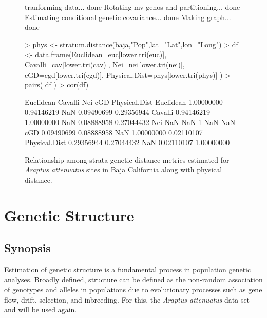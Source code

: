 \documentclass[letterpaper,twoside,openany]{book}
\begin{document}
\begin{figure}[bth]
	\centering
\begin{Schunk}
\begin{Soutput}
tranforming data... done
Rotating mv genos and partitioning...  done
Estimating conditional genetic covariance... done
Making graph... done
\end{Soutput}
\begin{Sinput}
> phys <- stratum.distance(baja,"Pop",lat="Lat",lon="Long")
> df <- data.frame(Euclidean=euc[lower.tri(euc)], Cavalli=cav[lower.tri(cav)], Nei=nei[lower.tri(nei)], cGD=cgd[lower.tri(cgd)], Physical.Dist=phys[lower.tri(phys)] )
> pairs( df )
> cor(df)
\end{Sinput}
\begin{Soutput}
               Euclidean    Cavalli Nei        cGD Physical.Dist
Euclidean     1.00000000 0.94146219 NaN 0.09490699    0.29356944
Cavalli       0.94146219 1.00000000 NaN 0.08888958    0.27044432
Nei                  NaN        NaN   1        NaN           NaN
cGD           0.09490699 0.08888958 NaN 1.00000000    0.02110107
Physical.Dist 0.29356944 0.27044432 NaN 0.02110107    1.00000000
\end{Soutput}
\end{Schunk}
	\caption{Relationship among strata genetic distance metrics estimated for \emph{Araptus attenuatus} sites in Baja California along with physical distance.}
	\label{fig:sonora_strata_dist}
\end{figure}


\chapter{Genetic Structure}


\section{Synopsis}

Estimation of genetic structure is a fundamental process in population genetic analyses.  Broadly defined, structure can be defined as the non-random association of genotypes and alleles in populations due to evolutionary processes such as gene flow, drift, selection, and inbreeding.  For this, the \emph{Araptus attenuatus} data set and will be used again.
\end{document}
